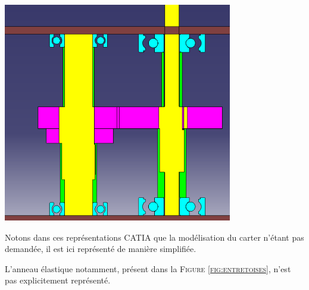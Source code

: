 \documentclass{config}
\begin{document}
\begin{spacing}{1.2}
\begin{center}
\includegraphics[width=0.75\textwidth]{vue_coupe_BE_E_I.PNG}
\end{center}

Notons dans ces représentations CATIA que la modélisation du carter n'étant pas demandée, il est ici représenté de manière simplifiée.

L'anneau élastique notamment, présent dans la \textsc{Figure \ref{fig:entretoises}}, n'est pas explicitement représenté.

\end{spacing}
\end{document}
